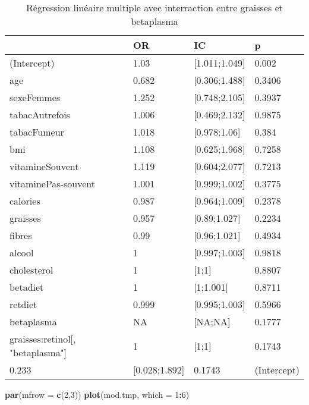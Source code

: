 \documentclass[]{article}
\newenvironment{Shaded}{\begin{snugshade}}{\end{snugshade}}
\newcommand{\KeywordTok}[1]{\textcolor[rgb]{0.13,0.29,0.53}{\textbf{#1}}}
\newcommand{\DataTypeTok}[1]{\textcolor[rgb]{0.13,0.29,0.53}{#1}}
\newcommand{\DecValTok}[1]{\textcolor[rgb]{0.00,0.00,0.81}{#1}}
\newcommand{\OperatorTok}[1]{\textcolor[rgb]{0.81,0.36,0.00}{\textbf{#1}}}
\newcommand{\NormalTok}[1]{#1}
\begin{document}
\begin{table}

\caption{\label{tab:unnamed-chunk-89}Régression linéaire multiple avec interraction entre graisses et betaplasma}
\centering
\begin{tabular}[t]{l|l|l|l}
\hline
  & OR & IC & p\\
\hline
\rowcolor[HTML]{BBD2E1}  (Intercept) & 1.03 & [1.011;1.049] & 0.002\\
\hline
age & 0.682 & [0.306;1.488] & 0.3406\\
\hline
\rowcolor[HTML]{BBD2E1}  sexeFemmes & 1.252 & [0.748;2.105] & 0.3937\\
\hline
tabacAutrefois & 1.006 & [0.469;2.132] & 0.9875\\
\hline
\rowcolor[HTML]{BBD2E1}  tabacFumeur & 1.018 & [0.978;1.06] & 0.384\\
\hline
bmi & 1.108 & [0.625;1.968] & 0.7258\\
\hline
\rowcolor[HTML]{BBD2E1}  vitamineSouvent & 1.119 & [0.604;2.077] & 0.7213\\
\hline
vitaminePas-souvent & 1.001 & [0.999;1.002] & 0.3775\\
\hline
\rowcolor[HTML]{BBD2E1}  calories & 0.987 & [0.964;1.009] & 0.2378\\
\hline
graisses & 0.957 & [0.89;1.027] & 0.2234\\
\hline
\rowcolor[HTML]{BBD2E1}  fibres & 0.99 & [0.96;1.021] & 0.4934\\
\hline
alcool & 1 & [0.997;1.003] & 0.9818\\
\hline
\rowcolor[HTML]{BBD2E1}  cholesterol & 1 & [1;1] & 0.8807\\
\hline
betadiet & 1 & [1;1.001] & 0.8711\\
\hline
\rowcolor[HTML]{BBD2E1}  retdiet & 0.999 & [0.995;1.003] & 0.5966\\
\hline
betaplasma & NA & [NA;NA] & 0.1777\\
\hline
\rowcolor[HTML]{BBD2E1}  graisses:retinol[, "betaplasma"] & 1 & [1;1] & 0.1743\\
\hline
0.233 & [0.028;1.892] & 0.1743 & (Intercept)\\
\hline
\end{tabular}
\end{table}

\begin{Shaded}
\begin{Highlighting}[]
\KeywordTok{par}\NormalTok{(}\DataTypeTok{mfrow =} \KeywordTok{c}\NormalTok{(}\DecValTok{2}\NormalTok{,}\DecValTok{3}\NormalTok{))}
\KeywordTok{plot}\NormalTok{(mod.tmp, }\DataTypeTok{which =} \DecValTok{1}\OperatorTok{:}\DecValTok{6}\NormalTok{)}
\end{Highlighting}
\end{Shaded}
\end{document}
